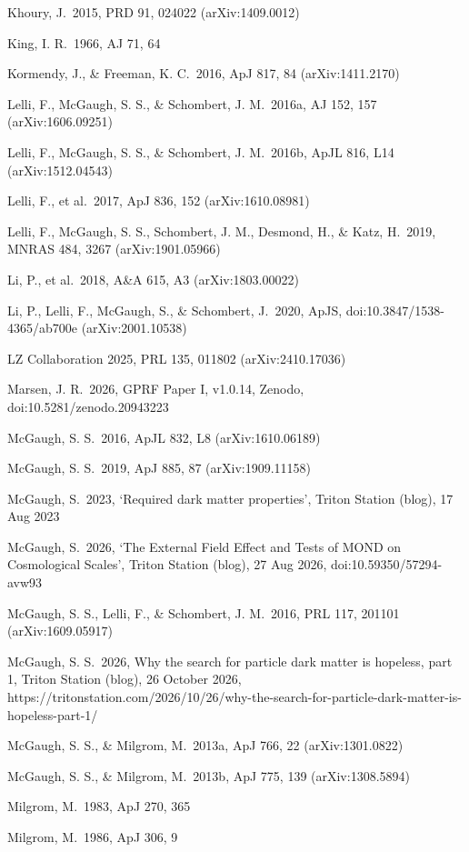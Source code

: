 \documentclass[
  10pt,
]{article}
\begin{document}
{\begin{list}{}{\setlength{\leftmargin}{1.5em}\setlength{\itemindent}{-1.5em}\setlength{\itemsep}{1pt}\setlength{\parsep}{0pt}}
\item Khoury, J.\ 2015, PRD 91, 024022 (arXiv:1409.0012)
\item King, I. R.\ 1966, AJ 71, 64
\item Kormendy, J., \& Freeman, K. C.\ 2016, ApJ 817, 84 (arXiv:1411.2170)
\item Lelli, F., McGaugh, S. S., \& Schombert, J. M.\ 2016a, AJ 152, 157 (arXiv:1606.09251)
\item Lelli, F., McGaugh, S. S., \& Schombert, J. M.\ 2016b, ApJL 816, L14 (arXiv:1512.04543)
\item Lelli, F., et al.\ 2017, ApJ 836, 152 (arXiv:1610.08981)
\item Lelli, F., McGaugh, S. S., Schombert, J. M., Desmond, H., \& Katz, H.\ 2019, MNRAS 484, 3267 (arXiv:1901.05966)
\item Li, P., et al.\ 2018, A\&A 615, A3 (arXiv:1803.00022)
\item Li, P., Lelli, F., McGaugh, S., \& Schombert, J.\ 2020, ApJS, doi:10.3847/1538-4365/ab700e (arXiv:2001.10538)
\item LZ Collaboration 2025, PRL 135, 011802 (arXiv:2410.17036)
\item Marsen, J. R.\ 2026, GPRF Paper I, v1.0.14, Zenodo, doi:10.5281/zenodo.20943223
\item McGaugh, S. S.\ 2016, ApJL 832, L8 (arXiv:1610.06189)
\item McGaugh, S. S.\ 2019, ApJ 885, 87 (arXiv:1909.11158)
\item McGaugh, S.\ 2023, `Required dark matter properties', Triton Station (blog), 17 Aug 2023
\item McGaugh, S.\ 2026, `The External Field Effect and Tests of MOND on Cosmological Scales', Triton Station (blog), 27 Aug 2026, doi:10.59350/57294-avw93
\item McGaugh, S. S., Lelli, F., \& Schombert, J. M.\ 2016, PRL 117, 201101 (arXiv:1609.05917)
\item McGaugh, S. S.\ 2026, Why the search for particle dark matter is hopeless, part 1, Triton Station (blog), 26 October 2026, https://tritonstation.com/2026/10/26/why-the-search-for-particle-dark-matter-is-hopeless-part-1/
\item McGaugh, S. S., \& Milgrom, M.\ 2013a, ApJ 766, 22 (arXiv:1301.0822)
\item McGaugh, S. S., \& Milgrom, M.\ 2013b, ApJ 775, 139 (arXiv:1308.5894)
\item Milgrom, M.\ 1983, ApJ 270, 365
\item Milgrom, M.\ 1986, ApJ 306, 9

\end{list}}
\end{document}
